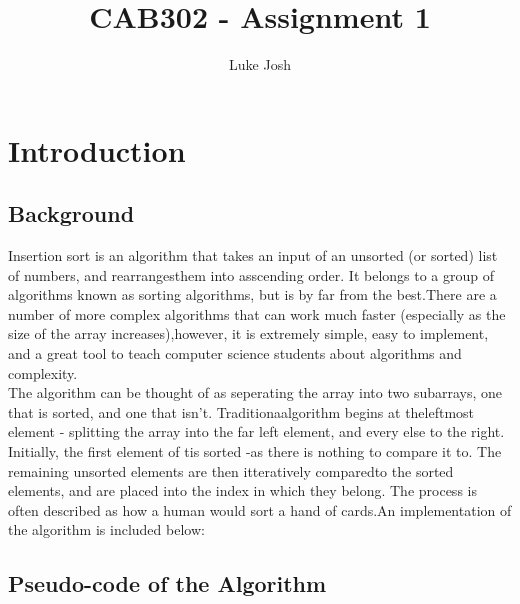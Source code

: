 \documentclass{article}
\title{CAB302 - Assignment 1}
\author{Luke Josh   }
\begin{document}

\maketitle\pagebreak
\tableofcontents
\pagebreak

\section{Introduction}
    \subsection{Background}
    Insertion sort is an algorithm that takes an input of an unsorted (or sorted) list of numbers, and rearrangesthem into asscending order. It belongs to a group of algorithms known as sorting algorithms, but is by far from the best.There are a number of more complex algorithms that can work much faster (especially as the size of the array increases),however, it is extremely simple, easy to implement, and a great tool to teach computer science students about algorithms and complexity.\\
    The algorithm can be thought of as seperating the array into two subarrays, one that is sorted, and one that isn't. Traditionaalgorithm begins at theleftmost element - splitting the array into the far left element, and every else to the right. Initially, the first element of tis sorted -as there is nothing to compare it to. The remaining unsorted elements are then itteratively comparedto the sorted elements, and are placed into the index in which they belong. The process is often described as how a human would sort a hand of cards.An implementation of the algorithm is included below:\\

    \subsection{Pseudo-code of the Algorithm}
        \begin{algorithmic}[1]  
                    \EndWhile
                \EndFor
            \EndFunction
        \end{algorithmic}
\end{document}
